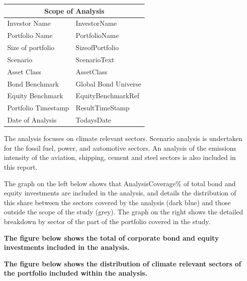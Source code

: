 \documentclass[10pt,table,a4]{article}\usepackage[]{graphicx}\usepackage[]{color}
\begin{document}
\begin{multicols}{2}
		
		\begin{center}
			{
				\setlength{\tabcolsep}{10pt} %
				\renewcommand{\arraystretch}{1.5} %
				\begin{tabular}{ p{.35\linewidth} p{.49\linewidth} }
					\hline
					\multicolumn{2}{c}{\textbf{Scope of Analysis}} \\
					\hline
					Investor Name & InvestorName \\ 
					Portfolio Name & PortfolioName \\ 
					Size of portfolio & SizeofPortfolio \\ 
					Scenario & ScenarioText \\ 
					Asset Class & AssetClass \\ 
					Bond Benchmark & Global Bond Universe \\
					Equity Benchmark & EquityBenchmarkRef \\
					Portfolio Timestamp & ResultTimeStamp \\ 
					Date of Analysis & TodaysDate \\ 
					\hline
				\end{tabular}
			}
			
		\end{center}
		
		The analysis focuses on climate relevant sectors. Scenario analysis is undertaken for the fossil fuel, power, and automotive sectors. An analysis of the emissions intensity of the aviation, shipping, cement and steel sectors is also included in this report.
		
		The graph on the left below shows that AnalysisCoverage\% of total bond and equity investments are included in the analysis, and details the distribution of this share between the sectors covered by the analysis (dark blue) and those outside the scope of the study (grey). The graph on the right shows the detailed breakdown by sector of the part of the portfolio covered in the study.
		
		
		
		
		\vspace{0.cm}
		
		
	\end{multicols}	
	
	\vspace{-0.4cm}
	\begin{multicols}{2}
		
		\textbf{The figure below shows the total of corporate bond and equity investments included in the analysis.} 
		
		\textbf{The figure below shows the distribution of climate relevant sectors of the portfolio included within the analysis.}
		
	\end{multicols}	
	
\end{document}

